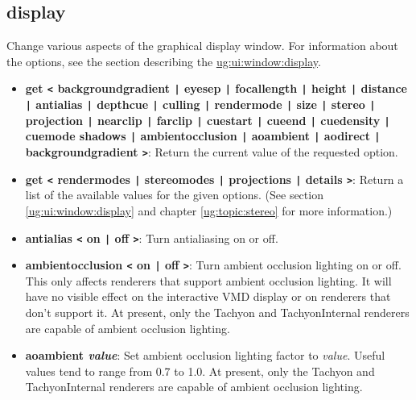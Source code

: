   \subsection{display}
  \label{ug:ui:text:display}
Change various aspects of the graphical display window.  For
information about the options, see the section describing the 
\hyperref{{\sf Display} window}{{\sf Display} window [\S }{]}{ug:ui:window:display}.


\begin{itemize} 
\item {\bf get {\tt <} backgroundgradient {\tt |} 
  eyesep {\tt |} focallength {\tt |} height {\tt |} 
  distance {\tt |} antialias {\tt |} depthcue {\tt |} 
  culling  {\tt |} rendermode {\tt |} size {\tt |} stereo {\tt |} 
  projection {\tt |} nearclip {\tt |} farclip {\tt |}
  cuestart {\tt |} cueend {\tt |} cuedensity {\tt |} cuemode 
  shadows {\tt |} ambientocclusion {\tt |} aoambient {\tt |} aodirect {\tt |}
  backgroundgradient {\tt >}}: 
  Return the current value of the requested option.

\item {\bf get {\tt <} rendermodes {\tt |} stereomodes {\tt |}  projections {\tt |} 
  details {\tt >}}: Return a list of the available values for the given 
  options.
  (See section \ref{ug:ui:window:display} and
  chapter \ref{ug:topic:stereo} 
  for more information.)

\item {\bf  antialias {\tt <}  on {\tt |} off {\tt >}}: Turn
    antialiasing on or off.

\item {\bf  ambientocclusion {\tt <}  on {\tt |} off {\tt >}}: Turn
    ambient occlusion lighting on or off.  This only affects renderers
    that support ambient occlusion lighting.  It will have no visible effect
    on the interactive VMD display or on renderers that don't support it.
    At present, only the Tachyon and TachyonInternal renderers are capable
    of ambient occlusion lighting.

\item {\bf  aoambient {\it value}}:
    Set ambient occlusion lighting factor to {\it value}.
    Useful values tend to range from 0.7 to 1.0. 
    At present, only the Tachyon and TachyonInternal renderers are capable
    of ambient occlusion lighting.


\end{itemize}
